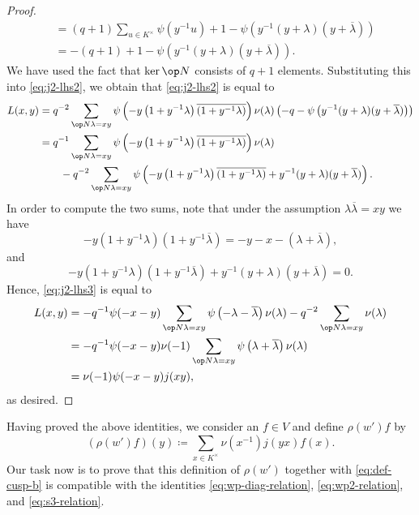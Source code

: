 \documentclass[../main.tex]{subfiles}
\begin{document}
\begin{proof}
\begin{align*}
		&= (q+1)\sum_{u\in K^\times}\psi\left(y^{-1}u\right)+1-\psi\left(y^{-1}(y+\lambda)(y+\overline\lambda)\right) \\
		&= -(q+1)+1-\psi\left(y^{-1}(y+\lambda)(y+\overline\lambda)\right).
	\end{align*}
	We have used the fact that $\ker\op N$ consists of $q+1$ elements. Substituting this into \eqref{eq:j2-lhs2}, we obtain that \eqref{eq:j2-lhs2} is equal to
	\begin{align}
		L(x,y) &= q^{-2}\sum_{\op N\lambda=xy}\psi\left(-y\left(1+y^{-1}\lambda\right)\overline{\left(1+y^{-1}\lambda\right)}\right)\nu(\lambda)\left(-q-\psi\left(y^{-1}(y+\lambda)(y+\overline\lambda)\right)\right) \notag \\
		&= q^{-1}\sum_{\op N\lambda=xy}\psi\left(-y\left(1+y^{-1}\lambda\right)\overline{\left(1+y^{-1}\lambda\right)}\right)\nu(\lambda) \notag \\
		&\qquad-q^{-2}\sum_{\op N\lambda=xy}\psi\left(-y\left(1+y^{-1}\lambda\right)\overline{\left(1+y^{-1}\lambda\right)}+y^{-1}(y+\lambda)(y+\overline\lambda)\right). \label{eq:j2-lhs3}
	\end{align}
	In order to compute the two sums, note that under the assumption $\lambda\overline\lambda=xy$ we have
	\[-y\left(1+y^{-1}\lambda\right)\left(1+y^{-1}\overline\lambda\right)=-y-x-(\lambda+\overline\lambda),\]
	and
	\[-y\left(1+y^{-1}\lambda\right)\left(1+y^{-1}\overline\lambda\right)+y^{-1}(y+\lambda)(y+\overline\lambda)=0.\]
	Hence, \eqref{eq:j2-lhs3} is equal to
	\begin{align*}
		L(x,y) &= -q^{-1}\psi(-x-y)\sum_{\op N\lambda=xy}\psi\left(-\lambda-\overline\lambda\right)\nu(\lambda)-q^{-2}\sum_{\op N\lambda=xy}\nu(\lambda) \\
		&= -q^{-1}\psi(-x-y)\nu(-1)\sum_{\op N\lambda=xy}\psi\left(\lambda+\overline\lambda\right)\nu(\lambda) \\
		&= \nu(-1)\psi(-x-y)j(xy),
	\end{align*}
	as desired.
\end{proof}
Having proved the above identities, we consider an $f\in V$ and define $\rho(w')f$ by
\begin{equation}
	\left(\rho(w')f\right)(y) \coloneqq \sum_{x\in K^\times}\nu\left(x^{-1}\right)j(yx)f(x). \label{eq:def-cusp-wp}
\end{equation}
Our task now is to prove that this definition of $\rho(w')$ together with \eqref{eq:def-cusp-b} is compatible with the identities \eqref{eq:wp-diag-relation}, \eqref{eq:wp2-relation}, and \eqref{eq:s3-relation}.
\end{document}

